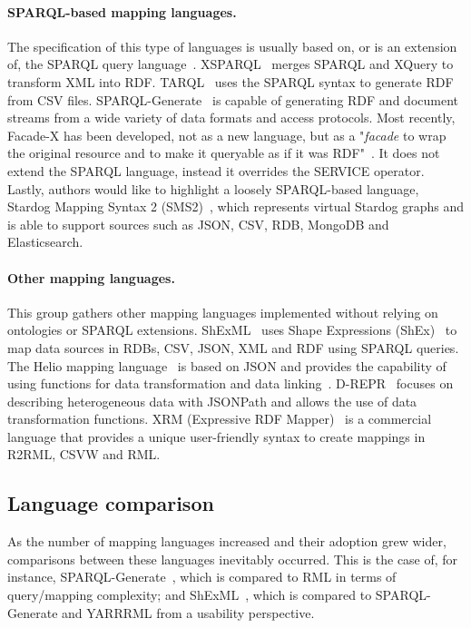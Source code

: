 \noindent\paragraph{\textbf{SPARQL-based mapping languages.}} The specification of this type of languages is usually based on, or is an extension of, the SPARQL query language~\cite{harris2013sparql}. XSPARQL~\cite{Bischof2012xsparql} merges SPARQL and XQuery to transform XML into RDF. TARQL~\cite{tarql} uses the SPARQL syntax to generate RDF from CSV files. SPARQL-Generate~\cite{Lefrancois2017sparqlgenerate} is capable of generating RDF and document streams from a wide variety of data formats and access protocols. Most recently, Facade-X has been developed, not as a new language, but as a "\textit{facade} to wrap the original resource and to make it queryable as if it was RDF"~\cite{daga2021facade}. It does not extend the SPARQL language, instead it overrides the SERVICE operator. Lastly, authors would like to highlight a loosely SPARQL-based language, Stardog Mapping Syntax 2 (SMS2)~\cite{sms2}, which represents virtual Stardog graphs and is able to support sources such as JSON, CSV, RDB, MongoDB and Elasticsearch.

\noindent\paragraph{\textbf{Other mapping languages.}} This group gathers other mapping languages implemented without relying on ontologies or SPARQL extensions. ShExML~\cite{Garcia-Gonzalez2020shexml,garcia2021shexml-challenges} uses Shape Expressions (ShEx)~\cite{prud2014shex} to map data sources in RDBs, CSV, JSON, XML and RDF using SPARQL queries. The Helio mapping language~\cite{cimmino2022helio} is based on JSON and provides the capability of using functions for data transformation and data linking~\cite{cimmino2018hybrid}. D-REPR~\cite{Vu2019d-repr} focuses on describing heterogeneous data with JSONPath and allows the use of data transformation functions. XRM (Expressive RDF Mapper)~\cite{xrm} is a commercial language that provides a unique user-friendly syntax to create mappings in R2RML, CSVW and RML.


\subsection{Language comparison}
As the number of mapping languages increased and their adoption grew wider, comparisons between these languages inevitably occurred. This is the case of, for instance, SPARQL-Generate~\cite{Lefrancois2017sparqlgenerate}, which is compared to RML in terms of query/mapping complexity; and ShExML~\cite{Garcia-Gonzalez2020shexml}, which is compared to SPARQL-Generate and YARRRML from a usability perspective.

